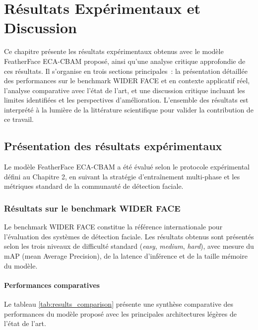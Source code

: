 \chapter{Résultats Expérimentaux et Discussion}
\begin{onehalfspace}

\hspace{0.65 cm}Ce chapitre présente les résultats expérimentaux obtenus avec le modèle FeatherFace ECA-CBAM proposé, ainsi qu'une analyse critique approfondie de ces résultats. Il s'organise en trois sections principales~: la présentation détaillée des performances sur le benchmark WIDER FACE et en contexte applicatif réel, l'analyse comparative avec l'état de l'art, et une discussion critique incluant les limites identifiées et les perspectives d'amélioration. L'ensemble des résultats est interprété à la lumière de la littérature scientifique pour valider la contribution de ce travail.

\section{Présentation des résultats expérimentaux}

\hspace{0.65 cm}Le modèle FeatherFace ECA-CBAM a été évalué selon le protocole expérimental défini au Chapitre 2, en suivant la stratégie d'entraînement multi-phase et les métriques standard de la communauté de détection faciale.

\subsection{Résultats sur le benchmark WIDER FACE}

\hspace{0.65 cm}Le benchmark WIDER FACE \cite{Yang2016WIDERFACE} constitue la référence internationale pour l'évaluation des systèmes de détection faciale. Les résultats obtenus sont présentés selon les trois niveaux de difficulté standard (\textit{easy}, \textit{medium}, \textit{hard}), avec mesure du mAP (mean Average Precision), de la latence d'inférence et de la taille mémoire du modèle.

\subsubsection{Performances comparatives}

\hspace{0.65 cm}Le tableau \ref{tab:results_comparison} présente une synthèse comparative des performances du modèle proposé avec les principales architectures légères de l'état de l'art.


\end{onehalfspace}

